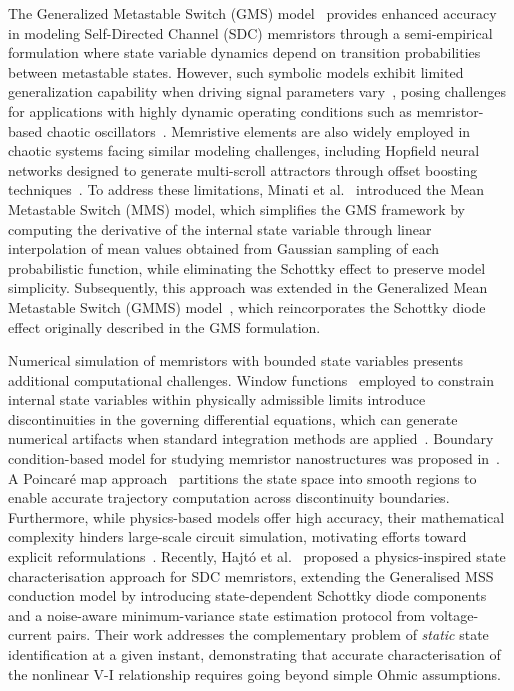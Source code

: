 \documentclass{ieeeaccess}
\begin{document}
The Generalized Metastable Switch (GMS) model~\cite{Molter2016} provides enhanced accuracy in modeling Self-Directed Channel (SDC) memristors through a semi-empirical formulation where state variable dynamics depend on transition probabilities between metastable states. However, such symbolic models exhibit limited generalization capability when driving signal parameters vary~\cite{Linn2014}, posing challenges for applications with highly dynamic operating conditions such as memristor-based chaotic oscillators~\cite{Galias2018}. Memristive elements are also widely employed in chaotic systems facing similar modeling challenges, including Hopfield neural networks designed to generate multi-scroll attractors through offset boosting techniques~\cite{Li2025}.
To address these limitations, Minati et al.~\cite{Minati2020} introduced the Mean Metastable Switch (MMS) model, which simplifies the GMS framework by computing the derivative of the internal state variable through linear interpolation of mean values obtained from Gaussian sampling of each probabilistic function, while eliminating the Schottky effect to preserve model simplicity. Subsequently, this approach was extended in the Generalized Mean Metastable Switch (GMMS) model~\cite{Ostrovskii2021, LagunaSanchez2023}, which reincorporates the Schottky diode effect originally described in the GMS formulation.

Numerical simulation of memristors with bounded state variables presents additional computational challenges. Window functions~\cite{Yakopcic2011,Kvatinsky2013} employed to constrain internal state variables within physically admissible limits introduce discontinuities in the governing differential equations, which can generate numerical artifacts when standard integration methods are applied~\cite{Slipko2021}. Boundary condition-based model for studying memristor nanostructures was proposed in~\cite{CorintoBoundaryConditionModelingMemristor}. A Poincaré map approach~\cite{Galias2019} partitions the state space into smooth regions to enable accurate trajectory computation across discontinuity boundaries. Furthermore, while physics-based models offer high accuracy, their mathematical complexity hinders large-scale circuit simulation, motivating efforts toward explicit reformulations~\cite{Ntinas2022}.
Recently, Hajt\'{o} et al.~\cite{Hajto2025} proposed a physics-inspired state characterisation approach for SDC memristors, extending the Generalised MSS conduction model by introducing state-dependent Schottky diode components and a noise-aware minimum-variance state estimation protocol from voltage-current pairs. Their work addresses the complementary problem of \emph{static} state identification at a given instant, demonstrating that accurate characterisation of the nonlinear V-I relationship requires going beyond simple Ohmic assumptions.
\end{document}
